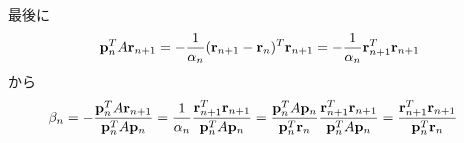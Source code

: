 \documentclass[11pt]{jarticle}
\begin{document}
最後に
\begin{align}
  {\bf p}_n^T A {\bf r}_{n+1} = -\frac{1}{\alpha_n} ({\bf r}_{n+1} - {\bf r}_n)^T {\bf r}_{n+1} = -\frac{1}{\alpha_n} {\bf r}_{n+1}^T {\bf r}_{n+1}
\end{align}
から
\begin{align}
  \beta_n &= - \frac{{\bf p}_{n}^T A {\bf r}_{n+1}}{{\bf p}_n^T A {\bf p}_n}
  = \frac{1}{\alpha_n} \frac{{\bf r}_{n+1}^T {\bf r}_{n+1}}{{\bf p}_n^T A {\bf p}_n}
  = \frac{{\bf p}_n^T A {\bf p}_n}{{\bf p}_n^T {\bf r}_n} \frac{{\bf r}_{n+1}^T {\bf r}_{n+1}}{{\bf p}_n^T A {\bf p}_n}
  =  \frac{{\bf r}_{n+1}^T {\bf r}_{n+1}}{{\bf p}_n^T {\bf r}_n}
\end{align}
\end{document}
